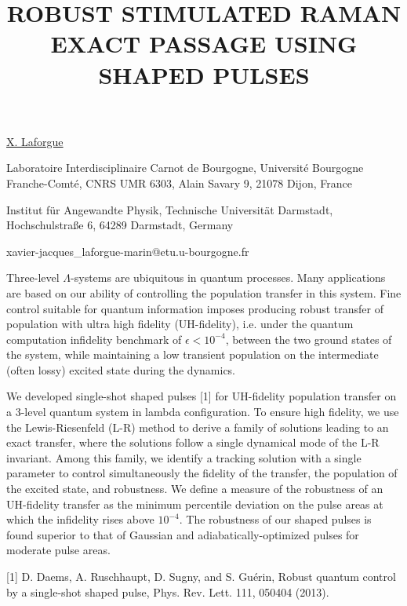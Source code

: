 \title{ROBUST STIMULATED RAMAN EXACT PASSAGE USING SHAPED PULSES}

\underline{X. Laforgue}  

{\normalsize{\vspace{-4mm}
Laboratoire Interdisciplinaire Carnot de Bourgogne, Universit\'e Bourgogne Franche-Comt\'e, CNRS UMR 6303, Alain Savary 9, 21078 Dijon, France

Institut f\"ur Angewandte Physik, Technische Universit\"at Darmstadt, Hochschulstra\ss e 6, 64289 Darmstadt, Germany



\email xavier-jacques_laforgue-marin@etu.u-bourgogne.fr}}

Three-level $\Lambda$-systems are ubiquitous in quantum processes. Many applications are based on our ability of controlling the population transfer in this system. Fine control suitable for quantum information imposes producing robust transfer of population with ultra high fidelity (UH-fidelity), i.e. under the quantum computation infidelity benchmark of $\epsilon<10^{-4}$, between the two ground states of the system, while maintaining a low transient population on the intermediate (often lossy) excited state during the dynamics.

We developed single-shot shaped pulses [1] for UH-fidelity population transfer on a 3-level quantum system in lambda configuration. To ensure high fidelity, we use the Lewis-Riesenfeld (L-R) method to derive a family of solutions leading to an exact transfer, where the solutions follow a single dynamical mode of the L-R invariant. Among this family, we identify a tracking solution with a single parameter to control simultaneously the fidelity of the transfer, the population of the excited state, and robustness. We define a measure of the robustness of an UH-fidelity transfer as the minimum percentile deviation on the pulse areas at which the infidelity rises above $10^{-4}$. The robustness of our shaped pulses is found superior to that of Gaussian and adiabatically-optimized pulses for moderate pulse areas.

{\normalsize
[1] D. Daems, A. Ruschhaupt, D. Sugny, and S. Gu\'erin, Robust quantum control by a single-shot shaped pulse, Phys. Rev. Lett. 111, 050404 (2013).
}

\vspace{\baselineskip}